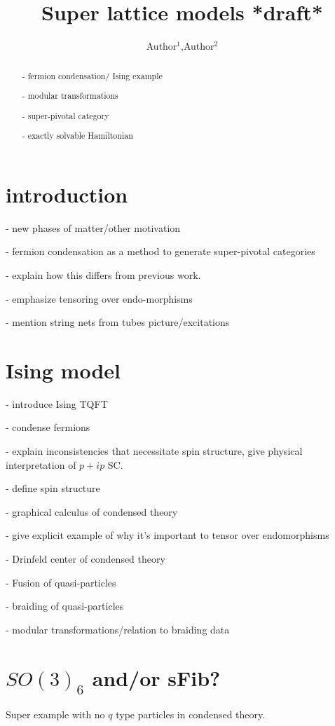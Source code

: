 \documentclass[11pt]{article}
\title{Super lattice models *draft*}
\author{Author$^1$,Author$^{2}$}
\affil{
$^1$ Affiliation1}
\affil{
$^2$ Affiliation2}
\numberwithin{equation}{section}
\begin{document}
\maketitle
\begin{abstract}
- fermion condensation/ Ising example

- modular transformations

- super-pivotal category

- exactly solvable Hamiltonian
 
\end{abstract}

\tableofcontents

\section{introduction}
- new phases of matter/other motivation

- fermion condensation as a method to generate super-pivotal categories

- explain how this differs from previous work. 

- emphasize tensoring over endo-morphisms

-  mention string nets from tubes picture/excitations

\section{Ising model}
- introduce Ising TQFT \cite{Lins1994}

- condense fermions

- explain inconsistencies that necessitate spin structure, give physical interpretation of $p+ip$ SC.

- define spin structure

- graphical calculus of condensed theory

- give explicit example of why it's important to tensor over endomorphisms

- Drinfeld center of condensed theory

- Fusion of quasi-particles

- braiding of quasi-particles 

- modular transformations/relation to braiding data

\section{$SO(3)_6$ and/or sFib?}
Super example with no $q$ type particles in condensed theory.
\end{document}

